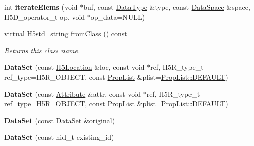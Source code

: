 \begin{DoxyCompactItemize}
\item 
\mbox{\label{class_h5_1_1_data_set_a23b1e511f401e1dca147d224a6240d96}} 
int {\bfseries iterate\+Elems} (void $\ast$buf, const \hyperlink{class_h5_1_1_data_type}{Data\+Type} \&type, const \hyperlink{class_h5_1_1_data_space}{Data\+Space} \&space, H5\+D\+\_\+operator\+\_\+t op, void $\ast$op\+\_\+data=N\+U\+LL)
\item 
\mbox{\label{class_h5_1_1_data_set_a82b132213ea66c345e0533c34a0bd4c1}} 
virtual H5std\+\_\+string \hyperlink{class_h5_1_1_data_set_a82b132213ea66c345e0533c34a0bd4c1}{from\+Class} () const
\begin{DoxyCompactList}\small\item\em Returns this class name. \end{DoxyCompactList}\item 
\mbox{\label{class_h5_1_1_data_set_a47ddc5594fd966e21f11db0dc6c199bc}} 
{\bfseries Data\+Set} (const \hyperlink{class_h5_1_1_h5_location}{H5\+Location} \&loc, const void $\ast$ref, H5\+R\+\_\+type\+\_\+t ref\+\_\+type=H5\+R\+\_\+\+O\+B\+J\+E\+CT, const \hyperlink{class_h5_1_1_prop_list}{Prop\+List} \&plist=\hyperlink{class_h5_1_1_prop_list_ae52af66ce82af0ea7e6dc57148c56241}{Prop\+List\+::\+D\+E\+F\+A\+U\+LT})
\item 
\mbox{\label{class_h5_1_1_data_set_a598e5d1f1de88333a2e406cf91638b27}} 
{\bfseries Data\+Set} (const \hyperlink{class_h5_1_1_attribute}{Attribute} \&attr, const void $\ast$ref, H5\+R\+\_\+type\+\_\+t ref\+\_\+type=H5\+R\+\_\+\+O\+B\+J\+E\+CT, const \hyperlink{class_h5_1_1_prop_list}{Prop\+List} \&plist=\hyperlink{class_h5_1_1_prop_list_ae52af66ce82af0ea7e6dc57148c56241}{Prop\+List\+::\+D\+E\+F\+A\+U\+LT})
\item 
\mbox{\label{class_h5_1_1_data_set_a224114f6fd3fdb01300ffcfd5e5192d5}} 
{\bfseries Data\+Set} (const \hyperlink{class_h5_1_1_data_set}{Data\+Set} \&original)
\item 
\mbox{\label{class_h5_1_1_data_set_a283d6e80f93309c1ee09a4c6a8dd574c}} 
{\bfseries Data\+Set} (const hid\+\_\+t existing\+\_\+id)
\item 
\mbox{\label{class_h5_1_1_data_set_a4eedfd16bd2361ff12c191db4d1d9844}} 

\end{DoxyCompactItemize}

